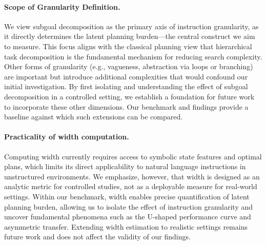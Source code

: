 \documentclass[11pt]{article}
\begin{document}
\paragraph{Scope of Granularity Definition.} We view subgoal decomposition as the primary axis of instruction granularity, as it directly determines the latent planning burden—the central construct we aim to measure. This focus aligns with the classical planning view that hierarchical task decomposition is the fundamental mechanism for reducing search complexity. Other forms of granularity (e.g., vagueness, abstraction via loops or branching) are important but introduce additional complexities that would confound our initial investigation. By first isolating and understanding the effect of subgoal decomposition in a controlled setting, we establish a foundation for future work to incorporate these other dimensions. Our benchmark and findings provide a baseline against which such extensions can be compared.

\paragraph{Practicality of width computation.}
Computing width currently requires access to symbolic state features and optimal plans, which limits its direct applicability to natural language instructions in unstructured environments. We emphasize, however, that width is designed as an analytic metric for controlled studies, not as a deployable measure for real-world settings. Within our benchmark, width enables precise quantification of latent planning burden, allowing us to isolate the effect of instruction granularity and uncover fundamental phenomena such as the U-shaped performance curve and asymmetric transfer. Extending width estimation to realistic settings remains future work and does not affect the validity of our findings.

\end{document}

